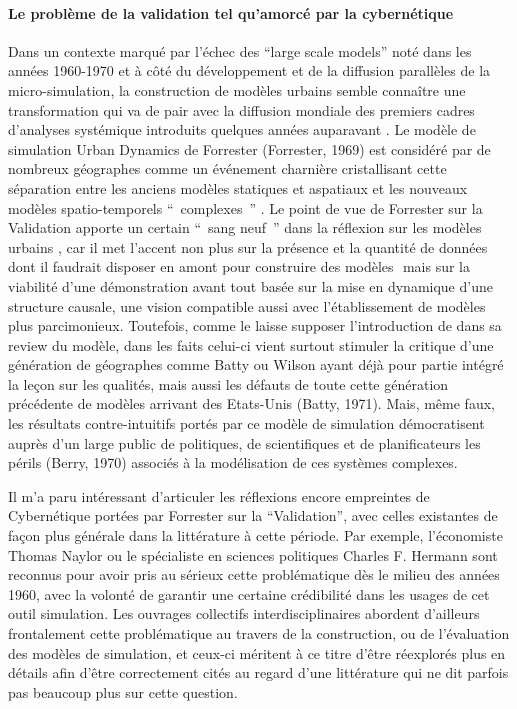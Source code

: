 \paragraph*{Le problème de la validation tel qu’amorcé par la cybernétique}

Dans un contexte marqué par l'échec des \foreignquote{english}{large scale models} noté dans les années 1960-1970 \autocite{Lee1973} et à côté du développement et de la diffusion parallèles de la micro-simulation, la construction de modèles urbains semble connaître une transformation qui va de pair avec la diffusion mondiale des premiers cadres d'analyses systémique introduits quelques années auparavant \autocites{Ackerman1963, Harvey1969, Berry1964a, Chorley1962, Haggett1965}⁠. Le modèle de simulation Urban Dynamics de Forrester (Forrester, 1969)⁠ est considéré par de nombreux géographes comme un événement charnière cristallisant cette séparation entre les anciens modèles statiques et aspatiaux et les nouveaux modèles spatio-temporels \enquote{ complexes } \autocites{Batty1976, Batty2005}. Le point de vue de Forrester sur la Validation apporte un certain \enquote{ sang neuf } dans la réflexion sur les modèles urbains \autocite{Lee1973}⁠, car il met l'accent non plus sur la présence et la quantité de données dont il faudrait disposer en amont pour construire des modèles \autocite[355]{Batty1976}⁠ mais sur la viabilité d'une démonstration avant tout basée sur la mise en dynamique d'une structure causale, une vision compatible aussi avec l'établissement de modèles plus parcimonieux. Toutefois, comme le laisse supposer l'introduction de \textcite{Tobler1970a}  dans sa review du modèle, dans les faits celui-ci vient surtout stimuler la critique d'une génération de géographes comme Batty ou Wilson ayant déjà pour partie intégré la leçon sur les qualités, mais aussi les défauts de toute cette génération précédente de modèles arrivant des Etats-Unis (Batty, 1971)⁠. Mais, même faux, les résultats contre-intuitifs portés par ce modèle de simulation démocratisent auprès d'un large public de politiques, de scientifiques et de planificateurs les périls (Berry, 1970)⁠ associés à la modélisation de ces systèmes complexes.

Il m'a paru intéressant d'articuler les réflexions encore empreintes de Cybernétique portées par Forrester sur la \enquote{Validation}, avec celles existantes de façon plus générale dans la littérature à cette période. Par exemple, l'économiste Thomas Naylor ou le spécialiste en sciences politiques Charles F. Hermann \autocites{Naylor1966,Naylor1967, Naylor1969, Hermann1967} sont reconnus \autocites{Nance2002, Balci1986} ⁠pour avoir pris au sérieux cette problématique dès le milieu des années 1960, avec la volonté de garantir une certaine crédibilité dans les usages de cet outil simulation. Les ouvrages collectifs interdisciplinaires \autocites{Guetzkow1972, Dutton1971}  abordent d'ailleurs frontalement cette problématique au travers de la construction, ou de l'évaluation des modèles de simulation, et ceux-ci méritent à ce titre d'être réexplorés plus en détails afin d'être correctement cités au regard d'une littérature qui ne dit parfois pas beaucoup plus sur cette question. 

